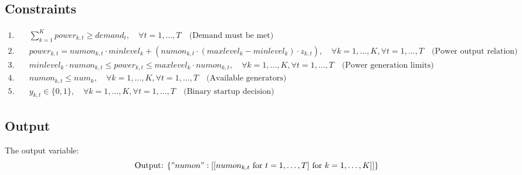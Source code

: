 \documentclass{article}
\begin{document}
\subsection*{Constraints}
\begin{align*}
1. & \quad \sum_{k=1}^{K} power_{k,t} \geq demand_t, \quad \forall t = 1, \ldots, T \quad \text{(Demand must be met)} \\
2. & \quad power_{k,t} = numon_{k,t} \cdot minlevel_k + (numon_{k,t} \cdot (maxlevel_k - minlevel_k) \cdot z_{k,t}), \quad \forall k = 1, \ldots, K, \forall t = 1, \ldots, T \quad \text{(Power output relation)} \\
3. & \quad minlevel_k \cdot numon_{k,t} \leq power_{k,t} \leq maxlevel_k \cdot numon_{k,t}, \quad \forall k = 1, \ldots, K, \forall t = 1, \ldots, T \quad \text{(Power generation limits)} \\
4. & \quad numon_{k,t} \leq num_k, \quad \forall k = 1, \ldots, K, \forall t = 1, \ldots, T \quad \text{(Available generators)} \\
5. & \quad y_{k,t} \in \{0, 1\}, \quad \forall k = 1, \ldots, K, \forall t = 1, \ldots, T \quad \text{(Binary startup decision)}
\end{align*}

\subsection*{Output}
The output variable:
\[
\text{Output: } \{ "numon": [[numon_{k,t} \text{ for } t=1,\ldots,T] \text{ for } k=1,\ldots,K] ] \}
\]
\end{document}

